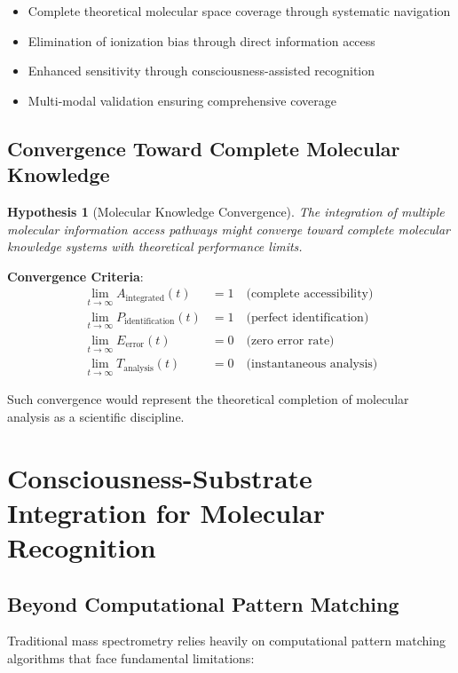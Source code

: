 \documentclass[11pt,a4paper]{article}
\newtheorem{hypothesis}[theorem]{Hypothesis}
\theoremstyle{remark}
\begin{document}
\begin{itemize}
\item Complete theoretical molecular space coverage through systematic navigation
\item Elimination of ionization bias through direct information access
\item Enhanced sensitivity through consciousness-assisted recognition
\item Multi-modal validation ensuring comprehensive coverage
\end{itemize}

\subsection{Convergence Toward Complete Molecular Knowledge}

\begin{hypothesis}[Molecular Knowledge Convergence]
The integration of multiple molecular information access pathways might converge toward complete molecular knowledge systems with theoretical performance limits.
\end{hypothesis}

\textbf{Convergence Criteria}:
\begin{align}
\lim_{t \to \infty} A_{\text{integrated}}(t) &= 1 \quad \text{(complete accessibility)}\\
\lim_{t \to \infty} P_{\text{identification}}(t) &= 1 \quad \text{(perfect identification)}\\
\lim_{t \to \infty} E_{\text{error}}(t) &= 0 \quad \text{(zero error rate)}\\
\lim_{t \to \infty} T_{\text{analysis}}(t) &= 0 \quad \text{(instantaneous analysis)}
\end{align}

Such convergence would represent the theoretical completion of molecular analysis as a scientific discipline.

\section{Consciousness-Substrate Integration for Molecular Recognition}

\subsection{Beyond Computational Pattern Matching}

Traditional mass spectrometry relies heavily on computational pattern matching algorithms that face fundamental limitations:
\end{document}
